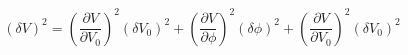 \begin{equation}
\label{eq:deltaV}
\left(\delta V\right)^2 = \left( \frac{\partial{V}}{\partial{V_0}}\right)^2 (\delta V_0)^2 + \left( \frac{\partial{V}}{\partial{\phi}}\right)^2 (\delta \phi)^2 + \left( \frac{\partial{V}}{\partial{V_0}}\right)^2 (\delta V_0)^2
\end{equation}